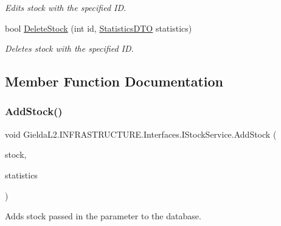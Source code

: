 \begin{DoxyCompactItemize}
\begin{DoxyCompactList}\small\item\em Edits stock with the specified ID. \end{DoxyCompactList}\item 
bool \mbox{\hyperlink{interface_gielda_l2_1_1_i_n_f_r_a_s_t_r_u_c_t_u_r_e_1_1_interfaces_1_1_i_stock_service_aaee8771ad67aa0e4ecd5a53a1defa1aa}{Delete\+Stock}} (int id, \mbox{\hyperlink{class_gielda_l2_1_1_i_n_f_r_a_s_t_r_u_c_t_u_r_e_1_1_d_t_o_1_1_statistics_d_t_o}{Statistics\+D\+TO}} statistics)
\begin{DoxyCompactList}\small\item\em Deletes stock with the specified ID. \end{DoxyCompactList}\end{DoxyCompactItemize}


\subsection{Member Function Documentation}
\mbox{\label{interface_gielda_l2_1_1_i_n_f_r_a_s_t_r_u_c_t_u_r_e_1_1_interfaces_1_1_i_stock_service_a6f46f5fa67e7cc83b8b7cbb3a68345ea}} 
\subsubsection{\texorpdfstring{AddStock()}{AddStock()}}
{\footnotesize\ttfamily void Gielda\+L2.\+I\+N\+F\+R\+A\+S\+T\+R\+U\+C\+T\+U\+R\+E.\+Interfaces.\+I\+Stock\+Service.\+Add\+Stock (\begin{DoxyParamCaption}\item[{\mbox{\hyperlink{class_gielda_l2_1_1_i_n_f_r_a_s_t_r_u_c_t_u_r_e_1_1_d_t_o_1_1_stock_d_t_o}{Stock\+D\+TO}}}]{stock,  }\item[{\mbox{\hyperlink{class_gielda_l2_1_1_i_n_f_r_a_s_t_r_u_c_t_u_r_e_1_1_d_t_o_1_1_statistics_d_t_o}{Statistics\+D\+TO}}}]{statistics }\end{DoxyParamCaption})}



Adds stock passed in the parameter to the database. 


